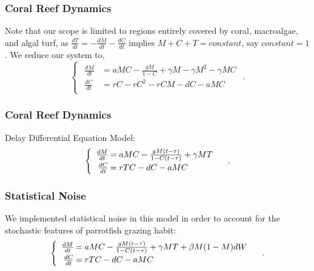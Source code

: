 \begin{frame}\frametitle{Coral Reef Dynamics}
\hspace{1.57em}Note that our scope is limited to regions entirely covered by coral, macroalgae, and algal turf, as $\frac{dT}{dt}=-\frac{dM}{dt}-\frac{dC}{dt}$ implies $M+C+T=constant$, say $constant = 1$.  We reduce our system to, $$\begin{cases} 
\begin{array}{rl}
\frac{dM}{dt}&= aMC-\frac{gM}{1-C} + \gamma M - \gamma M^2 -\gamma M C\\ 
\frac{dC}{dt}&=rC - rC^2 - rCM - dC - aMC
\end{array} \end{cases}.$$ 
\end{frame}

\begin{frame}\frametitle{Coral Reef Dynamics}
Delay Differential Equation Model:
$$\begin{cases}\begin{array}{rl}
\frac{dM}{dt}\hspace{-.8em}&=aMC - \frac{gM(t-\tau)}{1-C(t-\tau)}+\gamma M T\\
\frac{dC}{dt}\hspace{-.8em}&=rTC - dC - aMC\\
\end{array}\end{cases}.$$
\end{frame}

\begin{frame}
\frametitle{Statistical Noise}
We implemented statistical noise in this model in order to account for the stochastic features of parrotfish grazing habit: 
$$\begin{cases}\begin{array}{rl}
\frac{dM}{dt}\hspace{-.8em}&=aMC - \frac{gM(t-\tau)}{1-C(t-\tau)}+\gamma M T+\beta M(1-M)dW\\
\frac{dC}{dt}\hspace{-.8em}&=rTC - dC - aMC\\
\end{array}\end{cases}.$$
\end{frame}



